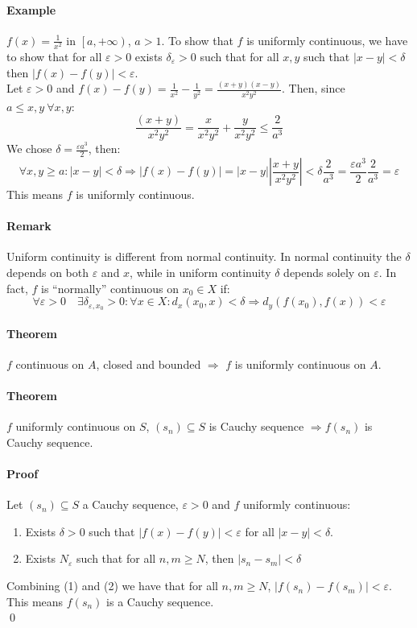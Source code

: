 \documentclass{article}
\newcommand{\abs}[1]{\left|#1\right|}
\newcommand{\Ep}{\varepsilon}
\newcommand{\Theorem}{\paragraph{Theorem}}
\newcommand{\Remark}{\paragraph{Remark}}
\newcommand{\Proof}{\paragraph{Proof}}
\newcommand{\Example}{\paragraph{Example}}
\begin{document}
  \Example $f(x) = \frac{1}{x^2}$ in $\left[a, +\infty\right)$, $a > 1$. To show
  that $f$ is uniformly continuous, we have to show that for all $\Ep > 0$
  exists $\delta_\Ep > 0$ such that for all $x,y$ such that $\abs{x-y} < \delta$
  then $\abs{f(x)-f(y)} < \Ep$.
\\Let $\Ep > 0$ and $f(x) - f(y) = \frac{1}{x^2} - \frac{1}{y^2} =
  \frac{(x+y)(x-y)}{x^2 y^2}$. Then, since $a \leq x,y \ \forall x,y$:
\begin{equation*}
  \frac{(x+y)}{x^2 y^2} = \frac{x}{x^2 y^2} + \frac{y}{x^2 y^2} \leq \frac{2}{a^3}
\end{equation*}
  We chose $\delta = \frac{\Ep a^3}{2}$, then:
\begin{equation*}
  \forall x,y \geq a : \abs{x-y} < \delta \Rightarrow \abs{f(x)-f(y)} =
  \abs{x-y} \abs{\frac{x+y}{x^2 y^2}} < \delta \frac{2}{a^3} =
  \frac{\Ep a^3}{2} \frac{2}{a^3} = \Ep
\end{equation*}
  This means $f$ is uniformly continuous.

  \Remark Uniform continuity is different from normal continuity. In normal
  continuity the $\delta$ depends on both $\Ep$ and $x$, while in uniform
  continuity $\delta$ depends solely on $\Ep$. In fact, $f$ is ``normally''
  continuous on $x_0 \in X$ if:
\begin{equation*}
  \forall \Ep > 0 \quad \exists \delta_{\Ep,x_0} > 0 : \forall x \in X :
  d_x(x_0,x) < \delta \Rightarrow d_y(f(x_0),f(x)) < \Ep
\end{equation*}

  \Theorem $f$ continuous on $A$, closed and bounded $\Rightarrow$ $f$ is
  uniformly continuous on $A$.

  \Theorem $f$ uniformly continuous on $S$, $(s_n) \subseteq S$ is Cauchy
  sequence $\Rightarrow f(s_n)$ is Cauchy sequence.

  \Proof Let $(s_n) \subseteq S$ a Cauchy sequence, $\Ep > 0$ and $f$ uniformly
  continuous:
\begin{enumerate}
  \item Exists $\delta > 0$ such that $\abs{f(x)-f(y)} < \Ep$ for all $\abs{x-y}
  < \delta$.
  \item Exists $N_\Ep$ such that for all $n,m \geq N$, then $\abs{s_n - s_m} <
  \delta$
\end{enumerate}
  Combining (1) and (2) we have that for all $n,m \geq N$, $\abs{f(s_n)-f(s_m)}
  < \Ep$. This means $f(s_n)$ is a Cauchy sequence.
\\\qed
\end{document}
